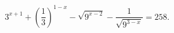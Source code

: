 \begin{ex}[type=equation]
	\begin{condition}
		$3^{x + 1} + \left(\dfrac{1}{3}\right)^{1 - x} - \sqrt{9^{x - 2}} - \dfrac{1}{\sqrt{9^{3 - x}}} = 258.$
	\end{condition}
\end{ex}